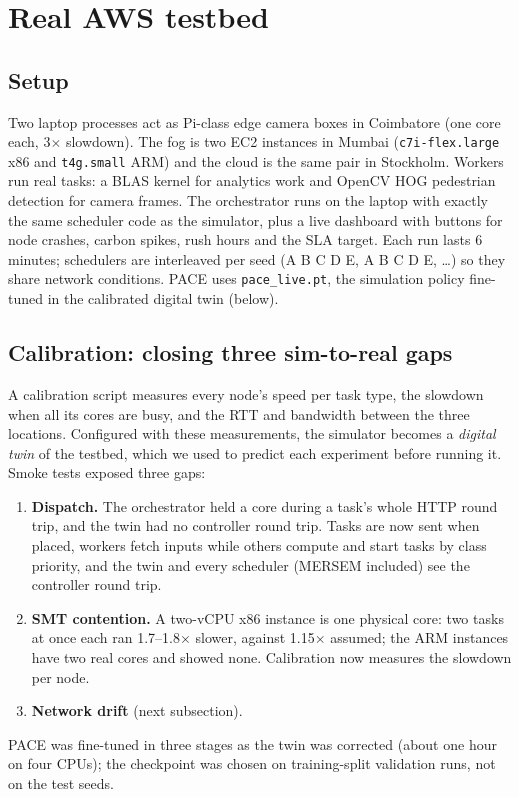 \documentclass[11pt,a4paper]{article}
\begin{document}
\section{Real AWS testbed}\label{sec:real}

\subsection{Setup}
Two laptop processes act as Pi-class edge camera boxes in Coimbatore (one core each, 3$\times$ slowdown). The fog is two EC2 instances in Mumbai (\texttt{c7i-flex.large} x86 and \texttt{t4g.small} ARM) and the cloud is the same pair in Stockholm. Workers run real tasks: a BLAS kernel for analytics work and OpenCV HOG pedestrian detection for camera frames. The orchestrator runs on the laptop with exactly the same scheduler code as the simulator, plus a live dashboard with buttons for node crashes, carbon spikes, rush hours and the SLA target. Each run lasts 6 minutes; schedulers are interleaved per seed (A B C D E, A B C D E, \ldots) so they share network conditions. PACE uses \texttt{pace\_live.pt}, the simulation policy fine-tuned in the calibrated digital twin (below).

\subsection{Calibration: closing three sim-to-real gaps}
A calibration script measures every node's speed per task type, the slowdown when all its cores are busy, and the RTT and bandwidth between the three locations. Configured with these measurements, the simulator becomes a \emph{digital twin} of the testbed, which we used to predict each experiment before running it. Smoke tests exposed three gaps:
\begin{enumerate}
\item \textbf{Dispatch.} The orchestrator held a core during a task's whole HTTP round trip, and the twin had no controller round trip. Tasks are now sent when placed, workers fetch inputs while others compute and start tasks by class priority, and the twin and every scheduler (MERSEM included) see the controller round trip.
\item \textbf{SMT contention.} A two-vCPU x86 instance is one physical core: two tasks at once each ran 1.7--1.8$\times$ slower, against 1.15$\times$ assumed; the ARM instances have two real cores and showed none. Calibration now measures the slowdown per node.
\item \textbf{Network drift} (next subsection).
\end{enumerate}
PACE was fine-tuned in three stages as the twin was corrected (about one hour on four CPUs); the checkpoint was chosen on training-split validation runs, not on the test seeds.
\end{document}
